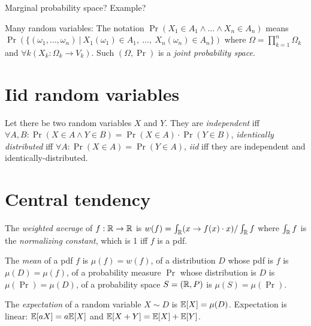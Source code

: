%
%
%
Marginal probability space?
Example?

Many random variables:
The notation \(\Pr(X_1\in A_1 \wedge \ldots \wedge X_n\in A_n)\) means
\(\Pr(\{(\omega_1,\ldots,\omega_n) ~|~ X_1(\omega_1) \in A_1, ~ \ldots, ~ X_n(\omega_n) \in A_n\})\)
where \(\Omega = \prod_{k=1}^n \Omega_k\)
and \(\forall k (X_k : \Omega_k \to V_k)\).
Such \((\Omega,\Pr)\) is a \emph{joint probability space}.

\section{Iid random variables}

Let there be two random variables \(X\) and \(Y\).
They are
%
%
\emph{independent} iff \(\forall A, B : \Pr(X \in A \wedge Y \in B) = \Pr(X \in A) \cdot \Pr(Y \in B)\),
%
%
\emph{identically distributed} iff
\(\forall A : \Pr(X \in A) = \Pr(Y \in A)\),
%
%
%
%
\emph{iid} iff they are independent and identically-distributed.

\section{Central tendency}

%
%
The \emph{weighted average} of \(f:\mathbb{R}\to\mathbb{R}\) is
\(w(f) = \int_{\mathbb{R}} (x \to f(x) \cdot x) / \int_{\mathbb{R}} f\)
where \(\int_{\mathbb{R}} f\) is the
%
%
\emph{normalizing constant},
which is 1 iff \(f\) is a pdf.

%
The \emph{mean} of a pdf \(f\) is \(\mu(f) = w(f)\),
%
of a distribution \(D\) whose pdf is \(f\) is \(\mu(D) = \mu(f)\),
%
of a probability measure \(\Pr\) whose distribution is \(D\) is
\(\mu(\Pr) = \mu(D)\),
%
of a probability space \(S = (\mathbb{R},P)\) is \(\mu(S) = \mu(\Pr)\).

%
The \emph{expectation} of a random variable \(X \sim D\) is \(\mathbb{E}[X] = \mu(D)\).
%
%
Expectation is linear:
\(\mathbb{E}[aX] = a \mathbb{E}[X]\) and
\(\mathbb{E}[X+Y] = \mathbb{E}[X] + \mathbb{E}[Y]\).

